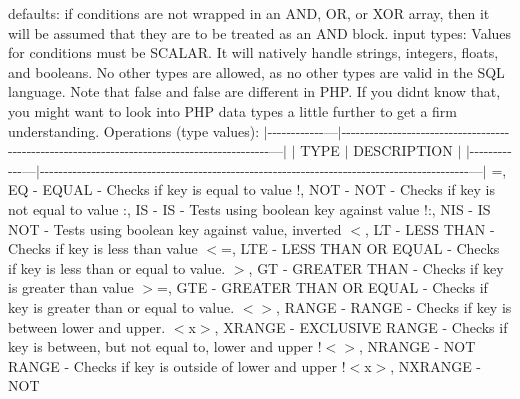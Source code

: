 defaults\+: if conditions are not wrapped in an A\+N\+D, O\+R, or X\+O\+R array, then it will be assumed that they are to be treated as an A\+N\+D block. input types\+: Values for conditions must be S\+C\+A\+L\+A\+R. It will natively handle strings, integers, floats, and booleans. No other types are allowed, as no other types are valid in the S\+Q\+L language. Note that false and \textquotesingle{}false\textquotesingle{} are different in P\+H\+P. If you didn\textquotesingle{}t know that, you might want to look into P\+H\+P data types a little further to get a firm understanding. Operations (\textquotesingle{}type\textquotesingle{} values)\+: $\vert$-\/-\/-\/-\/-\/-\/-\/-\/-\/-\/-\/-\/---$\vert$-\/-\/-\/-\/-\/-\/-\/-\/-\/-\/-\/-\/-\/-\/-\/-\/-\/-\/-\/-\/-\/-\/-\/-\/-\/-\/-\/-\/-\/-\/-\/-\/-\/-\/-\/-\/-\/-\/-\/-\/-\/-\/-\/-\/-\/-\/-\/-\/-\/-\/-\/-\/-\/-\/-\/-\/-\/-\/-\/-\/-\/-\/-\/-\/-\/-\/-\/-\/-\/-\/-\/-\/-\/-\/-\/-\/-\/-\/-\/-\/-\/-\/-\/-\/-\/-\/-\/-\/-\/-\/-\/-\/---$\vert$ $\vert$ T\+Y\+P\+E $\vert$ D\+E\+S\+C\+R\+I\+P\+T\+I\+O\+N $\vert$ $\vert$-\/-\/-\/-\/-\/-\/-\/-\/-\/-\/-\/-\/---$\vert$-\/-\/-\/-\/-\/-\/-\/-\/-\/-\/-\/-\/-\/-\/-\/-\/-\/-\/-\/-\/-\/-\/-\/-\/-\/-\/-\/-\/-\/-\/-\/-\/-\/-\/-\/-\/-\/-\/-\/-\/-\/-\/-\/-\/-\/-\/-\/-\/-\/-\/-\/-\/-\/-\/-\/-\/-\/-\/-\/-\/-\/-\/-\/-\/-\/-\/-\/-\/-\/-\/-\/-\/-\/-\/-\/-\/-\/-\/-\/-\/-\/-\/-\/-\/-\/-\/-\/-\/-\/-\/-\/-\/---$\vert$ =, E\+Q -\/ E\+Q\+U\+A\+L -\/ Checks if \textquotesingle{}key\textquotesingle{} is equal to \textquotesingle{}value\textquotesingle{} !, N\+O\+T -\/ N\+O\+T -\/ Checks if \textquotesingle{}key\textquotesingle{} is not equal to \textquotesingle{}value\textquotesingle{} \+:, I\+S -\/ I\+S -\/ Tests using boolean \textquotesingle{}key\textquotesingle{} against \textquotesingle{}value\textquotesingle{} !\+:, N\+I\+S -\/ I\+S N\+O\+T -\/ Tests using boolean \textquotesingle{}key\textquotesingle{} against \textquotesingle{}value\textquotesingle{}, inverted $<$, L\+T -\/ L\+E\+S\+S T\+H\+A\+N -\/ Checks if \textquotesingle{}key\textquotesingle{} is less than \textquotesingle{}value\textquotesingle{} $<$=, L\+T\+E -\/ L\+E\+S\+S T\+H\+A\+N O\+R E\+Q\+U\+A\+L -\/ Checks if \textquotesingle{}key\textquotesingle{} is less than or equal to \textquotesingle{}value\textquotesingle{}. $>$, G\+T -\/ G\+R\+E\+A\+T\+E\+R T\+H\+A\+N -\/ Checks if \textquotesingle{}key\textquotesingle{} is greater than \textquotesingle{}value\textquotesingle{} $>$=, G\+T\+E -\/ G\+R\+E\+A\+T\+E\+R T\+H\+A\+N O\+R E\+Q\+U\+A\+L -\/ Checks if \textquotesingle{}key\textquotesingle{} is greater than or equal to \textquotesingle{}value\textquotesingle{}. $<$$>$, R\+A\+N\+G\+E -\/ R\+A\+N\+G\+E -\/ Checks if \textquotesingle{}key\textquotesingle{} is between \textquotesingle{}lower\textquotesingle{} and \textquotesingle{}upper\textquotesingle{}. $<$x$>$, X\+R\+A\+N\+G\+E -\/ E\+X\+C\+L\+U\+S\+I\+V\+E R\+A\+N\+G\+E -\/ Checks if \textquotesingle{}key\textquotesingle{} is between, but not equal to, \textquotesingle{}lower\textquotesingle{} and \textquotesingle{}upper\textquotesingle{} !$<$$>$, N\+R\+A\+N\+G\+E -\/ N\+O\+T R\+A\+N\+G\+E -\/ Checks if \textquotesingle{}key\textquotesingle{} is outside of \textquotesingle{}lower\textquotesingle{} and \textquotesingle{}upper\textquotesingle{} !$<$x$>$, N\+X\+R\+A\+N\+G\+E -\/ N\+O\+T 